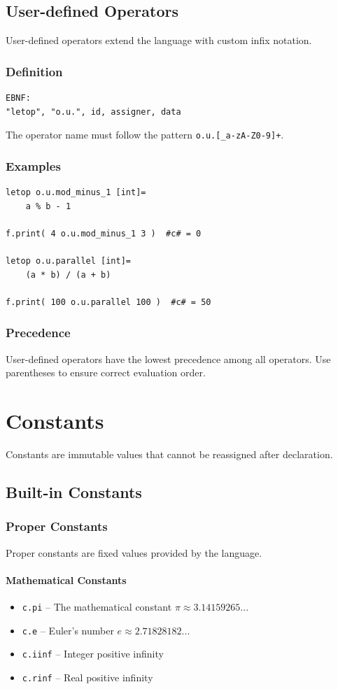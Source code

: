 \documentclass{report}
\begin{document}
\section{User-defined Operators}
User-defined operators extend the language with custom infix notation.

\subsection{Definition}
\begin{verbatim}
EBNF:
"letop", "o.u.", id, assigner, data
\end{verbatim}

The operator name must follow the pattern \texttt{o.u.[\_a-zA-Z0-9]+}.

\subsection{Examples}
\begin{verbatim}
letop o.u.mod_minus_1 [int]= 
    a % b - 1

f.print( 4 o.u.mod_minus_1 3 )  #c# = 0

letop o.u.parallel [int]= 
    (a * b) / (a + b)

f.print( 100 o.u.parallel 100 )  #c# = 50
\end{verbatim}

\subsection{Precedence}
User-defined operators have the lowest precedence among all operators. Use parentheses to ensure correct evaluation order.



\chapter{Constants}
Constants are immutable values that cannot be reassigned after declaration.

\section{Built-in Constants}
\subsection{Proper Constants}
Proper constants are fixed values provided by the language.

\subsubsection{Mathematical Constants}
\begin{itemize}
\item \texttt{c.pi} -- The mathematical constant $\pi \approx 3.14159265...$
\item \texttt{c.e} -- Euler's number $e \approx 2.71828182...$
\item \texttt{c.iinf} -- Integer positive infinity
\item \texttt{c.rinf} -- Real positive infinity
\end{itemize}
\end{document}
